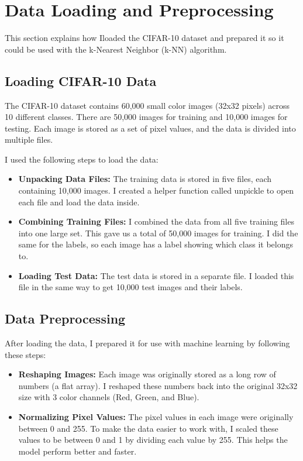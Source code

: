 \documentclass[lettersize,journal]{IEEEtran}
\begin{document}
\section{Data Loading and Preprocessing}

This section explains how Iloaded the CIFAR-10 dataset and prepared it so it could be used with the k-Nearest Neighbor (k-NN) algorithm.

\subsection{\textbf{Loading CIFAR-10 Data}}
The CIFAR-10 dataset contains 60,000 small color images (32x32 pixels) across 10 different classes. There are 50,000 images for training and 10,000 images for testing. Each image is stored as a set of pixel values, and the data is divided into multiple files.

I used the following steps to load the data:
\begin{itemize}
    \item \textbf{Unpacking Data Files:} The training data is stored in five files, each containing 10,000 images. I created a helper function called unpickle to open each file and load the data inside.
    \item \textbf{Combining Training Files:} I combined the data from all five training files into one large set. This gave us a total of 50,000 images for training. I did the same for the labels, so each image has a label showing which class it belongs to.
    \item \textbf{Loading Test Data:} The test data is stored in a separate file. I loaded this file in the same way to get 10,000 test images and their labels.
\end{itemize}

\subsection{\textbf{Data Preprocessing}}
After loading the data, I prepared it for use with machine learning by following these steps:

\begin{itemize}
    \item \textbf{Reshaping Images:} Each image was originally stored as a long row of numbers (a flat array). I reshaped these numbers back into the original 32x32 size with 3 color channels (Red, Green, and Blue).
    \item \textbf{Normalizing Pixel Values:} The pixel values in each image were originally between 0 and 255. To make the data easier to work with, I scaled these values to be between 0 and 1 by dividing each value by 255. This helps the model perform better and faster.
\end{itemize}
\end{document}

